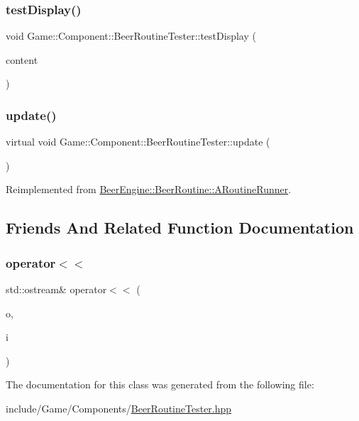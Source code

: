 \subsubsection{\texorpdfstring{test\+Display()}{testDisplay()}}
{\footnotesize\ttfamily void Game\+::\+Component\+::\+Beer\+Routine\+Tester\+::test\+Display (\begin{DoxyParamCaption}\item[{std\+::string}]{content }\end{DoxyParamCaption})}

\mbox{\label{class_game_1_1_component_1_1_beer_routine_tester_a2f14ce6211722f92a8ec5886dbeabd6c}} 
\subsubsection{\texorpdfstring{update()}{update()}}
{\footnotesize\ttfamily virtual void Game\+::\+Component\+::\+Beer\+Routine\+Tester\+::update (\begin{DoxyParamCaption}{ }\end{DoxyParamCaption})\hspace{0.3cm}{\ttfamily [virtual]}}



Reimplemented from \mbox{\hyperlink{class_beer_engine_1_1_beer_routine_1_1_a_routine_runner_a7a5253cb3a64dcb1aa66806fe7c12f62}{Beer\+Engine\+::\+Beer\+Routine\+::\+A\+Routine\+Runner}}.



\subsection{Friends And Related Function Documentation}
\mbox{\label{class_game_1_1_component_1_1_beer_routine_tester_ada4aa4bf7052377c97401aad042659d2}} 
\subsubsection{\texorpdfstring{operator$<$$<$}{operator<<}}
{\footnotesize\ttfamily std\+::ostream\& operator$<$$<$ (\begin{DoxyParamCaption}\item[{std\+::ostream \&}]{o,  }\item[{\mbox{\hyperlink{class_game_1_1_component_1_1_beer_routine_tester}{Beer\+Routine\+Tester}} const \&}]{i }\end{DoxyParamCaption})\hspace{0.3cm}{\ttfamily [friend]}}



The documentation for this class was generated from the following file\+:\begin{DoxyCompactItemize}
\item 
include/\+Game/\+Components/\mbox{\hyperlink{_beer_routine_tester_8hpp}{Beer\+Routine\+Tester.\+hpp}}\end{DoxyCompactItemize}
